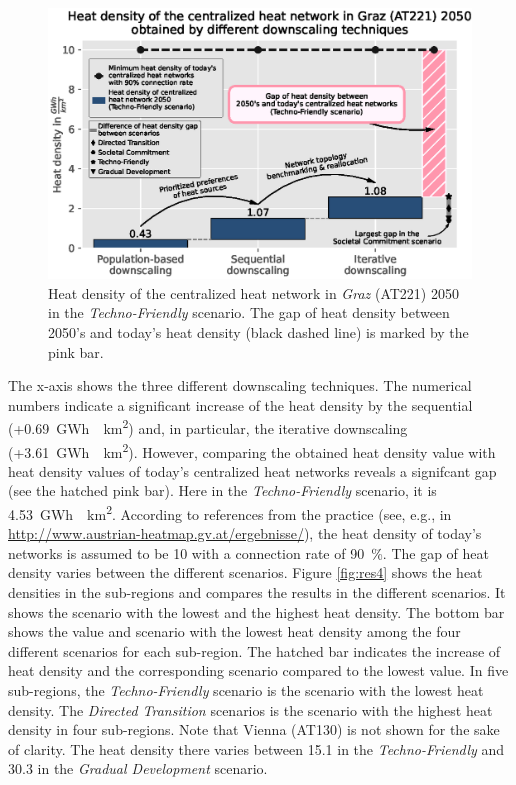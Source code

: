 \begin{figure}[h]
	\centering
	\includegraphics[width=1\linewidth]{figures/4_Results/Fig_Heat-density/HD_cleaned1.eps}
	\caption{Heat density of the centralized heat network in \textit{Graz} (AT221) 2050 in the \textit{Techno-Friendly} scenario. The gap of heat density between 2050's and today's heat density (black dashed line) is marked by the pink bar.}
	\label{fig:res5}
\end{figure}

The x-axis shows the three different downscaling techniques. The numerical numbers indicate a significant increase of the heat density by the sequential (+\SI{0.69}{GWh \per km^2}) and, in particular, the iterative downscaling (+\SI{3.61}{GWh \per km^2}). However, comparing the obtained heat density value with heat density values of today's centralized heat networks reveals a signifcant gap (see the hatched pink bar). Here in the \textit{Techno-Friendly} scenario, it is \SI{4.53}{GWh \per km^2}. According to references from the practice (see, e.g., in \url{http://www.austrian-heatmap.gv.at/ergebnisse/}), the heat density of today's networks is assumed to be \SI{10}{} with a connection rate of \SI{90}{\%}. The gap of heat density varies between the different scenarios. Figure \ref{fig:res4} shows the heat densities in the sub-regions and compares the results in the different scenarios. It shows the scenario with the lowest and the highest heat density. The bottom bar shows the value and scenario with the lowest heat density among the four different scenarios for each sub-region. The hatched bar indicates the increase of heat density and the corresponding scenario compared to the lowest value. In five sub-regions, the \textit{Techno-Friendly} scenario is the scenario with the lowest heat density. The \textit{Directed Transition} scenarios is the scenario with the highest heat density in four sub-regions. Note that Vienna (AT130) is not shown for the sake of clarity. The heat density there varies between \SI{15.1}{} in the \textit{Techno-Friendly} and \SI{30.3}{} in the \textit{Gradual Development} scenario.
 
